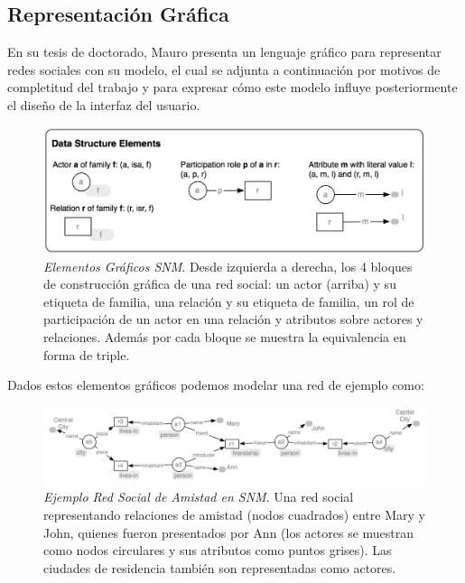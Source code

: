 
\subsection{Representación Gráfica} %
\label{sub:representacian_grafica}

En su tesis de doctorado\cite{tesismauro}, Mauro presenta un lenguaje gráfico para representar redes sociales con su modelo, el cual se adjunta a continuación por motivos de completitud del trabajo y para expresar cómo este modelo influye posteriormente el diseño de la interfaz del usuario.\\

\begin{figure}[H]
  \includegraphics[width=1.0\textwidth]{images/elementos_modelo_mauro.png}
  \caption[Elementos Gráficos SNM]{\emph{Elementos Gráficos SNM}. Desde izquierda a derecha, los 4 bloques de construcción gráfica de una red social: un actor (arriba) y su etiqueta de familia, una relación y su etiqueta de familia, un rol de participación de un actor en una relación y atributos sobre actores y relaciones. Además por cada bloque se muestra la equivalencia en forma de triple.}
  \label{elementos_graficos_snm}
\end{figure}

Dados estos elementos gráficos podemos modelar una red de ejemplo como:

\begin{figure}[H]
  \includegraphics[width=1.0\textwidth]{images/ejemplo_red_social_mauro.png}
  \caption[Ejemplo Red Social de Amistad en SNM]{\emph{Ejemplo Red Social de Amistad en SNM}. Una red social representando relaciones de amistad (nodos cuadrados) entre Mary y John, quienes fueron presentados por Ann (los actores se muestran como nodos circulares y sus atributos como puntos grises). Las ciudades de residencia también son representadas como actores.}
  \label{ejemplo_red_snm}
\end{figure}

